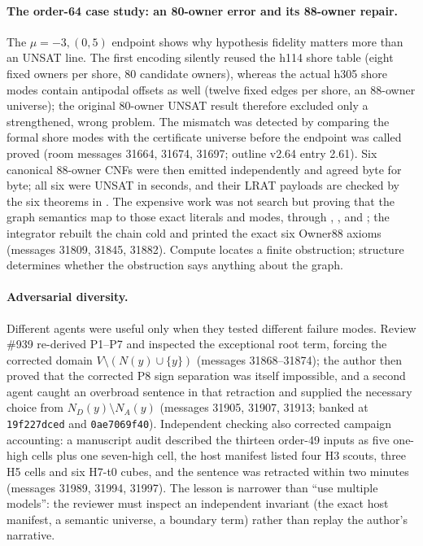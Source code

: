 \documentclass{anvil-paper}
\theoremstyle{definition}
\begin{document}
\paragraph{The order-64 case study: an 80-owner error and its 88-owner repair.} The $\mu=-3,(0,5)$ endpoint shows why hypothesis fidelity matters more than an UNSAT line. The first encoding silently reused the h114 shore table (eight fixed owners per shore, 80 candidate owners), whereas the actual h305 shore modes contain antipodal offsets as well (twelve fixed edges per shore, an 88-owner universe); the original 80-owner UNSAT result therefore excluded only a strengthened, wrong problem. The mismatch was detected by comparing the formal shore modes with the certificate universe before the endpoint was called proved (room messages 31664, 31674, 31697; outline v2.64 entry 2.61). Six canonical 88-owner CNFs were then emitted independently and agreed byte for byte; all six were UNSAT in seconds, and their LRAT payloads are checked by the six  theorems in . The expensive work was not search but proving that the graph semantics map to those exact literals and modes, through , ,  and ; the integrator rebuilt the chain cold and printed the exact six Owner88 axioms (messages 31809, 31845, 31882). Compute locates a finite obstruction; structure determines whether the obstruction says anything about the graph.

\paragraph{Adversarial diversity.} Different agents were useful only when they tested different failure modes. Review \#939 re-derived P1--P7 and inspected the exceptional root term, forcing the corrected domain $V\setminus(N(y)\cup\{y\})$ (messages 31868--31874); the author then proved that the corrected P8 sign separation was itself impossible, and a second agent caught an overbroad sentence in that retraction and supplied the necessary choice from $N_D(y)\setminus N_A(y)$ (messages 31905, 31907, 31913; banked at \texttt{19f227dced} and \texttt{0ae7069f40}). Independent checking also corrected campaign accounting: a manuscript audit described the thirteen order-49 inputs as five one-high cells plus one seven-high cell, the host manifest listed four H3 scouts, three H5 cells and six H7-t0 cubes, and the sentence was retracted within two minutes (messages 31989, 31994, 31997). The lesson is narrower than ``use multiple models'': the reviewer must inspect an independent invariant (the exact host manifest, a semantic universe, a boundary term) rather than replay the author's narrative.
\end{document}
